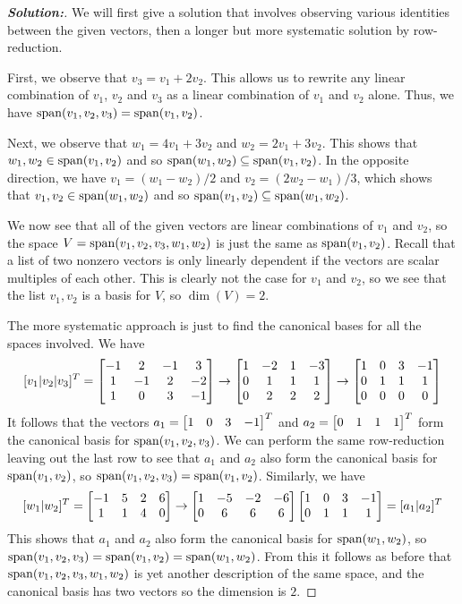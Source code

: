 \documentclass[a4paper]{amsart}
\theoremstyle{definition}
\newenvironment{solution}{\begin{proof}[\textbf{Solution:}] \vphantom{u}}{\end{proof}}
\begin{document}
\begin{solution}
 We will first give a solution that involves observing various
 identities between the given vectors, then a longer but more
 systematic solution by row-reduction.

 First, we observe that $v_3=v_1+2v_2$.  This allows us to rewrite any
 linear combination of $v_1$, $v_2$ and $v_3$ as a linear combination
 of $v_1$ and $v_2$ alone.  Thus, we have
 $\operatorname{span}(v_1,v_2,v_3)=\operatorname{span}(v_1,v_2)$.  

 Next, we observe that $w_1=4v_1+3v_2$ and $w_2=2v_1+3v_2$.  This
 shows that $w_1,w_2\in\operatorname{span}(v_1,v_2)$ and so
 $\operatorname{span}(w_1,w_2)\subseteq\operatorname{span}(v_1,v_2)$.  In the opposite direction, we have 
 $v_1=(w_1-w_2)/2$ and $v_2=(2w_2-w_1)/3$, which shows that
 $v_1,v_2\in\operatorname{span}(w_1,w_2)$ and so $\operatorname{span}(v_1,v_2)\subseteq\operatorname{span}(w_1,w_2)$.

 We now see that all of the given vectors are linear combinations of
 $v_1$ and $v_2$, so the space $V=\operatorname{span}(v_1,v_2,v_3,w_1,w_2)$ is just
 the same as $\operatorname{span}(v_1,v_2)$.  Recall that a list of two nonzero
 vectors is only linearly dependent if the vectors are scalar
 multiples of each other.  This is clearly not the case for $v_1$ and
 $v_2$, so we see that the list $v_1,v_2$ is a basis for $V$, so
 $\dim(V)=2$.  

 The more systematic approach is just to find the canonical bases for
 all the spaces involved.  We have
 \[ 
  [v_1|v_2|v_3]^T 
  = 
  \left[\begin{matrix} 
   -1 &  2 & -1 &  3 \\
    1 & -1 &  2 & -2 \\
    1 &  0 &  3 & -1 
  \end{matrix}\right]
  \to 
  \left[\begin{matrix} 
    1 & -2 &  1 & -3 \\
    0 &  1 &  1 &  1 \\
    0 &  2 &  2 &  2 
  \end{matrix}\right]
  \to
  \left[\begin{matrix} 
    1 &  0 &  3 & -1 \\
    0 &  1 &  1 &  1 \\
    0 &  0 &  0 &  0 
  \end{matrix}\right]
 \]
 It follows that the vectors $a_1=\left[\begin{matrix} 1&0&3&-1\end{matrix}\right]^T$ and
 $a_2=\left[\begin{matrix} 0&1&1&1\end{matrix}\right]^T$ form the canonical basis for
 $\operatorname{span}(v_1,v_2,v_3)$.  We can perform the same row-reduction leaving
 out the last row to see that $a_1$ and $a_2$ also form the canonical
 basis for $\operatorname{span}(v_1,v_2)$, so $\operatorname{span}(v_1,v_2,v_3)=\operatorname{span}(v_1,v_2)$.
 Similarly, we have
 \[ [w_1|w_2]^T =
     \left[\begin{matrix}
      -1 &  5 &  2 &  6 \\
       1 &  1 &  4 &  0 
     \end{matrix}\right] 
     \to
     \left[\begin{matrix}
       1 & -5 & -2 & -6 \\
       0 &  6 &  6 &  6 
     \end{matrix}\right] 
     \left[\begin{matrix}
       1 &  0 &  3 & -1 \\
       0 &  1 &  1 &  1 
     \end{matrix}\right] 
     =
     [a_1|a_2]^T
 \]
 This shows that $a_1$ and $a_2$ also form the canonical
 basis for $\operatorname{span}(w_1,w_2)$, so
 $\operatorname{span}(v_1,v_2,v_3)=\operatorname{span}(v_1,v_2)=\operatorname{span}(w_1,w_2)$.  From this it
 follows as before that $\operatorname{span}(v_1,v_2,v_3,w_1,w_2)$ is yet another
 description of the same space, and the canonical basis has two
 vectors so the dimension is $2$.
\end{solution}
\end{document}
